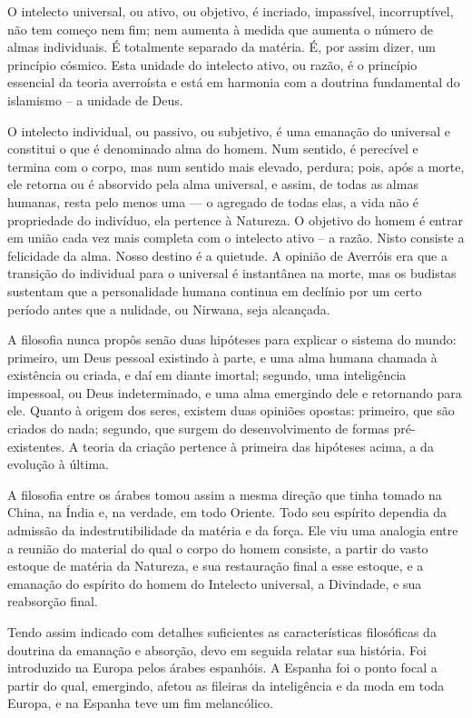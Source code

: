 \documentclass[11pt,a5paper,twoside,openany]{book}
\begin{document}
O intelecto universal, ou ativo, ou objetivo, é incriado, impassível, incorruptível, não tem começo nem fim; nem aumenta à medida que aumenta o número de almas individuais. É totalmente separado da matéria. É, por assim dizer, um princípio cósmico. Esta unidade do intelecto ativo, ou razão, é o princípio essencial da teoria averroísta e está em harmonia com a doutrina fundamental do islamismo – a unidade de Deus.

O intelecto individual, ou passivo, ou subjetivo, é uma emanação do universal e constitui o que é denominado alma do homem. Num sentido, é perecível e termina com o corpo, mas num sentido mais elevado, perdura; pois, após a morte, ele retorna ou é absorvido pela alma universal, e assim, de todas as almas humanas, resta pelo menos uma — o agregado de todas elas, a vida não é propriedade do indivíduo, ela pertence à Natureza. O objetivo do homem é entrar em união cada vez mais completa com o intelecto ativo – a razão. Nisto consiste a felicidade da alma. Nosso destino é a quietude. A opinião de Averróis era que a transição do individual para o universal é instantânea na morte, mas os budistas sustentam que a personalidade humana continua em declínio por um certo período antes que a nulidade, ou Nirwana, seja alcançada.

A filosofia nunca propôs senão duas hipóteses para explicar o sistema do mundo: primeiro, um Deus pessoal existindo à parte, e uma alma humana chamada à existência ou criada, e daí em diante imortal; segundo, uma inteligência impessoal, ou Deus indeterminado, e uma alma emergindo dele e retornando para ele. Quanto à origem dos seres, existem duas opiniões opostas: primeiro, que são criados do nada; segundo, que surgem do desenvolvimento de formas pré-existentes. A teoria da criação pertence à primeira das hipóteses acima, a da evolução à última.

A filosofia entre os árabes tomou assim a mesma direção que tinha tomado na China, na Índia e, na verdade, em todo Oriente. Todo seu espírito dependia da admissão da indestrutibilidade da matéria e da força. Ele viu uma analogia entre a reunião do material do qual o corpo do homem consiste, a partir do vasto estoque de matéria da Natureza, e sua restauração final a esse estoque, e a emanação do espírito do homem do Intelecto universal, a Divindade, e sua reabsorção final.

Tendo assim indicado com detalhes suficientes as características filosóficas da doutrina da emanação e absorção, devo em seguida relatar sua história. Foi introduzido na Europa pelos árabes espanhóis. A Espanha foi o ponto focal a partir do qual, emergindo, afetou as fileiras da inteligência e da moda em toda Europa, e na Espanha teve um fim melancólico.
\end{document}
